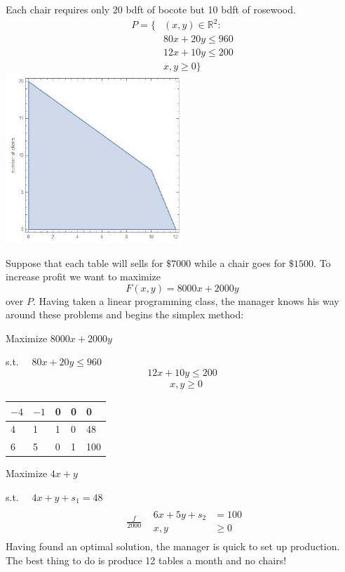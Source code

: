 Each chair requires only 20 bdft of bocote but 10 bdft of rosewood.
$$
\begin{aligned}
P=\{&(x, y) \in \mathbb{R}^{2}: \\
& 80 x+20 y \leq 960 \\
& 12 x+10 y \leq 200 \\
&x, y \geq 0\}
\end{aligned}
$$
\includegraphics[width=0.5\textwidth]{optimization/multi-objective/images/2022_02_28_634e8079070800ac7e3cg-03}

Suppose that each table will sells for $\$ 7000$ while a chair goes for $\$ 1500 .$ To increase profit we want to maximize
$$
F(x, y)=8000 x+2000 y
$$
over $P$. Having taken a linear programming class, the manager knows his way around these problems and begins the simplex method:

Maximize $8000 x+2000 y$

s.t. $\quad 80 x+20 y \leq 960$
$$
12 x+10 y \leq 200
$$
$$
\begin{aligned}
& x, y \geq 0
\end{aligned}
$$
\begin{tabular}{llll|l}
$-4$ & $-1$ & 0 & 0 & 0 \\
\hline
4 & 1 & 1 & 0 & 48 \\
6 & 5 & 0 & 1 & 100 \\
\end{tabular}

Maximize $4 x+y$

s.t. $\quad 4 x+y+s_{1}=48$
$$
\begin{aligned}
& \begin{aligned}\frac{f}{2000} & \begin{aligned}6 x+5 y+s_{2} &=100 \\x, y & \geq 0\end{aligned}\end{aligned} 
\end{aligned}
$$
Having found an optimal solution, the manager is quick to set up production. The best thing to do is produce 12 tables a month and no chairs!


